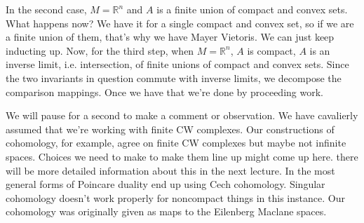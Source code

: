 \documentclass[10pt]{article}
\theoremstyle{definition}
\begin{document}
In the second case, $M=\mathbb{R}^n$ and $A$ is a finite union of compact and convex sets. What happens now? We have it for a single compact and convex set, so if we are a finite union of them, that's why we have Mayer Vietoris. We can just keep inducting up. Now, for the third step, when $M=\mathbb{R}^n$, $A$ is compact, $A$ is an inverse limit, i.e. intersection, of finite unions of compact and convex sets. Since the two invariants in question commute with inverse limits, we decompose the comparison mappings. Once we have that we're done by proceeding work. 

We will pause for a second to make a comment or observation. We have cavalierly assumed that we're working with finite CW complexes. Our constructions of cohomology, for example, agree on finite CW complexes but maybe not infinite spaces. Choices we need to make to make them line up might come up here. there will be more detailed information about this in the next lecture. In the most general forms of Poincare duality end up using Cech cohomology. Singular cohomology doesn't work properly for noncompact things in this instance. Our cohomology was originally given as maps to the Eilenberg Maclane spaces. 
\end{document}
